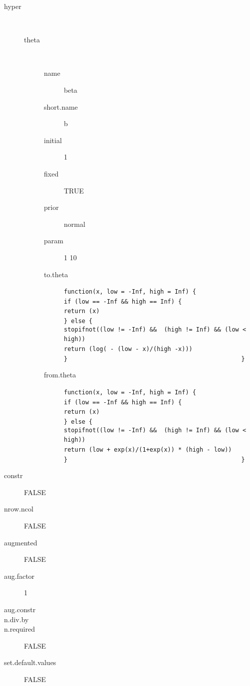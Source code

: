\begin{description}
	\item[hyper]\ 
	 \begin{description}
	 	\item[theta]\ 
	 	 \begin{description}
	 	 	 \item[ name ] beta 
	 	 	 \item[ short.name ] b 
	 	 	 \item[ initial ] 1 
	 	 	 \item[ fixed ] TRUE 
	 	 	 \item[ prior ] normal 
	 	 	 \item[ param ] 1 10 
	 	 	 \item[ to.theta ] \verb|function(x, low = -Inf, high = Inf) {| \verb|                                                    if (low == -Inf && high == Inf) {| \verb|                                                        return (x)| \verb|                                                    } else {| \verb|                                                        stopifnot((low != -Inf) &&  (high != Inf) && (low < high))| \verb|                                                        return (log( - (low - x)/(high -x))) | \verb|                                                    }| \verb|                                                }| 
	 	 	 \item[ from.theta ] \verb|function(x, low = -Inf, high = Inf) {| \verb|                                                    if (low == -Inf && high == Inf) {| \verb|                                                        return (x)| \verb|                                                    } else {| \verb|                                                        stopifnot((low != -Inf) &&  (high != Inf) && (low < high))| \verb|                                                        return (low + exp(x)/(1+exp(x)) * (high - low))| \verb|                                                    }| \verb|                                                }| 
	 	 \end{description}
	 \end{description}
	 \item[ constr ] FALSE 
	 \item[ nrow.ncol ] FALSE 
	 \item[ augmented ] FALSE 
	 \item[ aug.factor ] 1 
	 \item[ aug.constr ]  
	 \item[ n.div.by ]  
	 \item[ n.required ] FALSE 
	 \item[ set.default.values ] FALSE 
\end{description}
